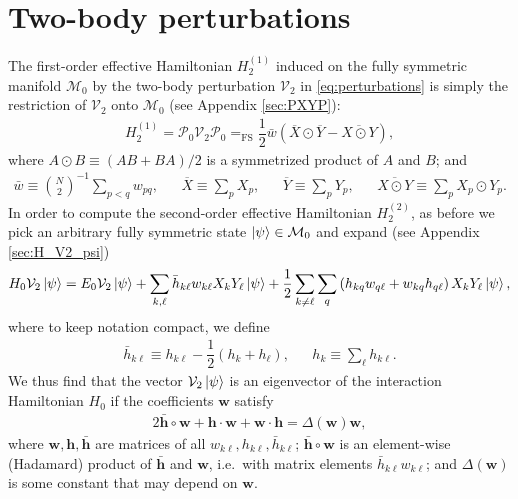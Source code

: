 \documentclass[nofootinbib,notitlepage,11pt]{revtex4-2}
\newcommand{\f}[2]{\dfrac{#1}{#2}} %
\newcommand{\p}[1]{\left(#1\right)} %
\renewcommand{\c}{\cdot} %
\newcommand{\m}{\bm} %
\newcommand{\1}{\mathds{1}}
\newcommand{\M}{\mathcal{M}}
\renewcommand{\P}{\mathcal{P}}
\newcommand{\V}{\mathcal{V}}
\newcommand{\EQFS}{=_{\text{FS}}}
\newcommand{\col}{\overline}
\begin{document}
\section{Two-body perturbations}
\label{sec:two_body}

The first-order effective Hamiltonian $H_2^{(1)}$ induced on the fully
symmetric manifold $\M_0$ by the two-body perturbation $\V_2$ in
\eqref{eq:perturbations} is simply the restriction of $\V_2$ onto
$\M_0$ (see Appendix \ref{sec:PXYP}):
\begin{align}
  H_2^{(1)}
  = \P_0 \V_2 \P_0
  \EQFS \f12 \bar w \p{\col{X}\odot\col{Y} - \col{X\odot Y}},
\end{align}
where $A\odot B\equiv\p{AB+BA}/2$ is a symmetrized product of $A$ and
$B$; and
\begin{align}
  \bar w \equiv {N\choose 2}^{-1} \sum_{p<q} w_{pq},
  &&
  \col{X} \equiv \sum_p X_p,
  &&
  \col{Y} \equiv \sum_p Y_p,
  &&
  \col{X\odot Y} \equiv \sum_p X_p\odot Y_p.
\end{align}
In order to compute the second-order effective Hamiltonian
$H_2^{(2)}$, as before we pick an arbitrary fully symmetric state
$\ket\psi\in\M_0$ and expand (see Appendix \ref{sec:H_V2_psi})
\begin{align}
  H_0 \V_2 \ket\psi
  = E_0 \V_2 \ket\psi
  + \sum_{k,\ell} \bar h_{k\ell} w_{k\ell} X_k Y_\ell \ket\psi
  + \f12 \sum_{k\ne\ell} \sum_q \p{h_{kq} w_{q\ell} + w_{kq} h_{q\ell}}
  X_k Y_\ell \ket\psi,
  \label{eq:H_V2_psi}
\end{align}
where to keep notation compact, we define
\begin{align}
  \bar h_{k\ell} \equiv h_{k\ell} - \f12\p{h_k + h_\ell},
  &&
  h_k \equiv \sum_\ell h_{k\ell}.
\end{align}
We thus find that the vector $\V_2\ket\psi$ is an eigenvector of the
interaction Hamiltonian $H_0$ if the coefficients $\m w$ satisfy
\begin{align}
  2\bar{\m h} \circ \m w + \m h\c\m w + \m w\c\m h
  = \Delta\p{\m w} \m w,
  \label{eq:cond_2}
\end{align}
where $\m w,\m h,\bar{\m h}$ are matrices of all
$w_{k\ell},h_{k\ell},\bar h_{k\ell}$; $\bar{\m h} \circ \m w$ is an
element-wise (Hadamard) product of $\bar{\m h}$ and $\m w$, i.e.~with
matrix elements $\bar h_{k\ell} w_{k\ell}$; and $\Delta\p{\m w}$ is
some constant that may depend on $\m w$.
\end{document}
